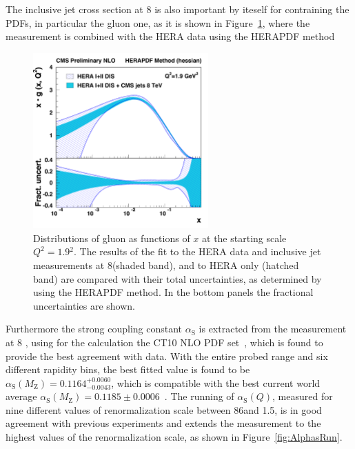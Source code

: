 \documentclass{PoS}
\def\as{\ensuremath{\alpha_\mathrm{S}}\xspace}
\def\asq{\ensuremath{\alpha_\mathrm{S}(Q)}\xspace}
\providecommand{\alpsmz}{\ensuremath{\alpha_\mathrm{S}(M_\mathrm{Z})}\xspace}
\begin{document}
The inclusive jet cross section at 8 \TeV is also important by iteself for contraining the PDFs, in particular the gluon
one, as it is shown in Figure~\ref{fig:pdf}, where the measurement is combined with the HERA
data\cite{Abramowicz:2015mha} using the HERAPDF method~\cite{Aaron:2009aa} 
\begin{figure}[h]
\center
   \includegraphics[width=0.6\textwidth]{Figure3b.pdf}
\setlength{\unitlength}{1cm}
\caption{Distributions of gluon as functions of $x$ at the starting scale
  $Q^2=1.9$\GeV$^2$. The results of the fit to the HERA
  data and inclusive jet measurements at 8\TeV (shaded band), and to
  HERA only (hatched band) are compared with their total
  uncertainties, as determined by using the HERAPDF method. In the
  bottom panels the fractional uncertainties are shown.}
\label{fig:pdf}
\end{figure}
Furthermore the strong coupling constant \as is extracted from the measurement at 8 \TeV, using for the calculation the CT10 NLO PDF
set~\cite{Lai:2010vv}, which is found to provide the best agreement with data.
With the entire probed \pt range and six different rapidity bins, the best fitted value is found to be $\alpsmz =
0.1164^{+0.0060}_{-0.0043}$, which is compatible with the best current world average $\alpsmz =
0.1185\pm0.0006$~\cite{Agashe:2014kda}. The running of \asq, measured for nine different values of renormalization scale 
between 86\GeV and 1.5\TeV, is in good agreement with previous experiments and extends the measurement to the highest
values of the renormalization scale, as shown in Figure~\ref{fig:AlphasRun}.
\end{document}
